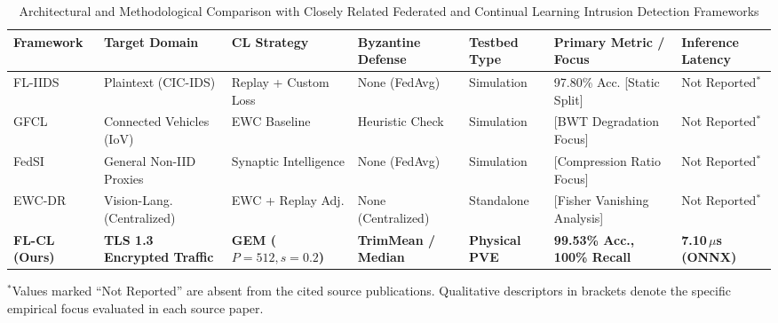 \documentclass[journal,10pt,twocolumn]{IEEEtran}
\begin{document}
\begin{table}[t]
\caption{Architectural and Methodological Comparison with Closely Related Federated and Continual Learning Intrusion Detection Frameworks}
\label{tab:comparison_table}
\centering
\scriptsize
\renewcommand{\arraystretch}{1.2}
\setlength{\tabcolsep}{3pt}
\begin{tabular*}{\textwidth}{@{\extracolsep{\fill}}lllllll@{}}
\toprule
\textbf{Framework} & \textbf{Target Domain} & \textbf{CL Strategy} & \textbf{Byzantine Defense} & \textbf{Testbed Type} & \textbf{Primary Metric / Focus} & \textbf{Inference Latency} \\
\midrule
FL-IIDS~\cite{jin2024fliids} & Plaintext (CIC-IDS) & Replay + Custom Loss & None (FedAvg) & Simulation & 97.80\% Acc. [Static Split] & Not Reported$^*$ \\
GFCL~\cite{talpur2022gfcl} & Connected Vehicles (IoV) & EWC Baseline & Heuristic Check & Simulation & [BWT Degradation Focus] & Not Reported$^*$ \\
FedSI~\cite{zhang2023communication} & General Non-IID Proxies & Synaptic Intelligence & None (FedAvg) & Simulation & [Compression Ratio Focus] & Not Reported$^*$ \\
EWC-DR~\cite{liu2026ewc} & Vision-Lang. (Centralized) & EWC + Replay Adj. & None (Centralized) & Standalone & [Fisher Vanishing Analysis] & Not Reported$^*$ \\
\textbf{FL-CL (Ours)} & \textbf{TLS 1.3 Encrypted Traffic} & \textbf{GEM ($P{=}512, s{=}0.2$)} & \textbf{TrimMean / Median} & \textbf{Physical PVE} & \textbf{99.53\% Acc., 100\% Recall} & \textbf{7.10\,$\mu$s (ONNX)} \\
\bottomrule
\end{tabular*}
\vspace{1pt}
\begin{flushleft}
\scriptsize $^*$Values marked ``Not Reported'' are absent from the cited source publications. Qualitative descriptors in brackets denote the specific empirical focus evaluated in each source paper.
\end{flushleft}
\end{table}
\end{document}
